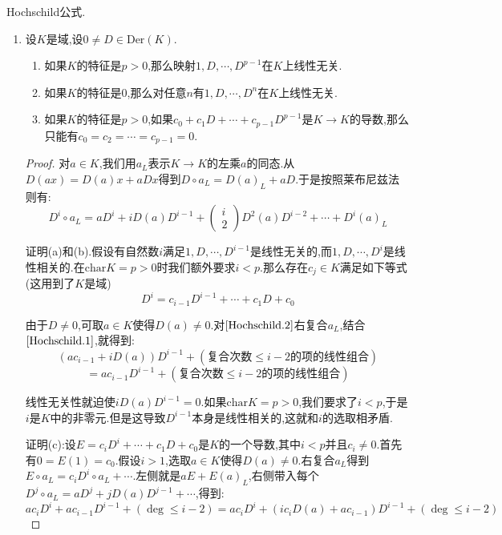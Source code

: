 Hochschild公式.
\begin{enumerate}
	\item 设$K$是域,设$0\not=D\in\mathrm{Der}(K)$.
	\begin{enumerate}
		\item 如果$K$的特征是$p>0$,那么映射$1,D,\cdots,D^{p-1}$在$K$上线性无关.
		\item 如果$K$的特征是0,那么对任意$n$有$1,D,\cdots,D^n$在$K$上线性无关.
		\item 如果$K$的特征是$p>0$,如果$c_0+c_1D+\cdots+c_{p-1}D^{p-1}$是$K\to K$的导数,那么只能有$c_0=c_2=\cdots=c_{p-1}=0$.
	\end{enumerate}
	\begin{proof}
		
		对$a\in K$,我们用$a_L$表示$K\to K$的左乘$a$的同态.从$D(ax)=D(a)x+aDx$得到$D\circ a_L=D(a)_L+aD$.于是按照莱布尼兹法则有:
		\begin{equation}\label{Hochschild.1}
			D^i\circ a_L=aD^i+iD(a)D^{i-1}+\left(\begin{array}{c}i\\2\end{array}\right)D^2(a)D^{i-2}+\cdots+D^i(a)_L
		\end{equation}
		
		证明(a)和(b).假设有自然数$i$满足$1,D,\cdots,D^{i-1}$是线性无关的,而$1,D,\cdots,D^i$是线性相关的.在$\mathrm{char}K=p>0$时我们额外要求$i<p$.那么存在$c_j\in K$满足如下等式(这用到了$K$是域)
		\begin{equation}\label{Hochschild.2}
			D^i=c_{i-1}D^{i-1}+\cdots+c_1D+c_0
		\end{equation}
		
		由于$D\not=0$,可取$a\in K$使得$D(a)\not=0$.对$\ref{Hochschild.2}$右复合$a_L$,结合$\ref{Hochschild.1}$,就得到:
		$$\left(ac_{i-1}+iD(a)\right)D^{i-1}+\left(\text{复合次数}\le i-2\text{的项的线性组合}\right)$$
		$$=ac_{i-1}D^{i-1}+\left(\text{复合次数}\le i-2\text{的项的线性组合}\right)$$
		
		线性无关性就迫使$iD(a)D^{i-1}=0$.如果$\mathrm{char}K=p>0$,我们要求了$i<p$,于是$i$是$K$中的非零元.但是这导致$D^{i-1}$本身是线性相关的,这就和$i$的选取相矛盾.
		
		\qquad
		
		证明(c):设$E=c_iD^i+\cdots+c_1D+c_0$是$K$的一个导数,其中$i<p$并且$c_i\not=0$.首先有$0=E(1)=c_0$.假设$i>1$,选取$a\in K$使得$D(a)\not=0$.右复合$a_L$得到$E\circ a_L=c_iD^i\circ a_L+\cdots$.左侧就是$aE+E(a)_L$,右侧带入每个$D^j\circ a_L=aD^j+jD(a)D^{j-1}+\cdots$,得到:
		$$ac_iD^i+ac_{i-1}D^{i-1}+\left(\deg\le i-2\right)=ac_iD^i+\left(ic_iD(a)+ac_{i-1}\right)D^{i-1}+\left(\deg\le i-2\right)$$
		

\end{proof}
\end{enumerate}
